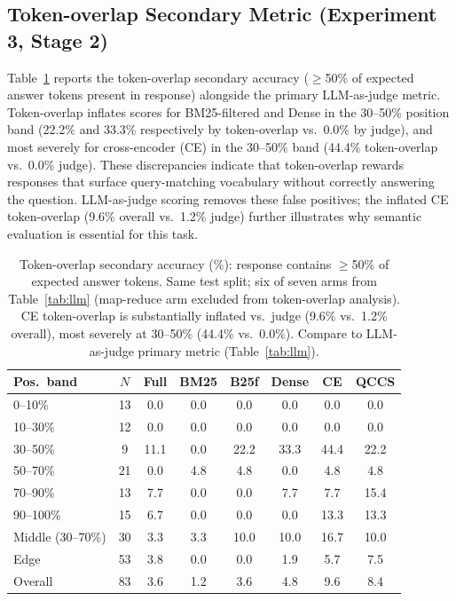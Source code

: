 \documentclass{article}
\begin{document}

\subsection{Token-overlap Secondary Metric (Experiment 3, Stage 2)}
\label{app:tokoverlap}

Table~\ref{tab:tokoverlap} reports the token-overlap secondary accuracy
($\geq$50\% of expected answer tokens present in response) alongside the
primary LLM-as-judge metric. Token-overlap inflates scores for BM25-filtered
and Dense in the 30--50\% position band (22.2\% and 33.3\% respectively by
token-overlap vs.\ 0.0\% by judge), and most severely for cross-encoder (CE) in
the 30--50\% band (44.4\% token-overlap vs.\ 0.0\% judge). These discrepancies
indicate that token-overlap rewards responses that surface query-matching vocabulary
without correctly answering the question. LLM-as-judge scoring removes these
false positives; the inflated CE token-overlap (9.6\% overall vs.\ 1.2\% judge)
further illustrates why semantic evaluation is essential for this task.

\begin{table}[H]
\centering
\caption{Token-overlap secondary accuracy (\%): response contains $\geq$50\%
  of expected answer tokens. Same test split; six of seven arms from Table~\ref{tab:llm}
  (map-reduce arm excluded from token-overlap analysis).
  CE token-overlap is substantially inflated vs.\ judge (9.6\% vs.\ 1.2\% overall),
  most severely at 30--50\% (44.4\% vs.\ 0.0\%). Compare to LLM-as-judge
  primary metric (Table~\ref{tab:llm}).}
\label{tab:tokoverlap}
\small
\setlength{\tabcolsep}{3pt}
\begin{tabular}{@{}lc cccccc@{}}
\toprule
Pos.\ band & $N$ & Full & BM25 & B25f & Dense & CE & QCCS \\
\midrule
0--10\%   & 13 &  0.0 &  0.0 &  0.0 &  0.0 &  0.0 &  0.0 \\
10--30\%  & 12 &  0.0 &  0.0 &  0.0 &  0.0 &  0.0 &  0.0 \\
30--50\%  &  9 & 11.1 &  0.0 & 22.2 & 33.3 & 44.4 & 22.2 \\
50--70\%  & 21 &  0.0 &  4.8 &  4.8 &  0.0 &  4.8 &  4.8 \\
70--90\%  & 13 &  7.7 &  0.0 &  0.0 &  7.7 &  7.7 & 15.4 \\
90--100\% & 15 &  6.7 &  0.0 &  0.0 &  0.0 & 13.3 & 13.3 \\
\midrule
Middle (30--70\%) & 30 & 3.3 & 3.3 & 10.0 & 10.0 & 16.7 & 10.0 \\
Edge              & 53 & 3.8 & 0.0 &  0.0 &  1.9 &  5.7 &  7.5 \\
Overall           & 83 & 3.6 & 1.2 &  3.6 &  4.8 &  9.6 &  8.4 \\
\bottomrule
\end{tabular}
\end{table}
\end{document}
